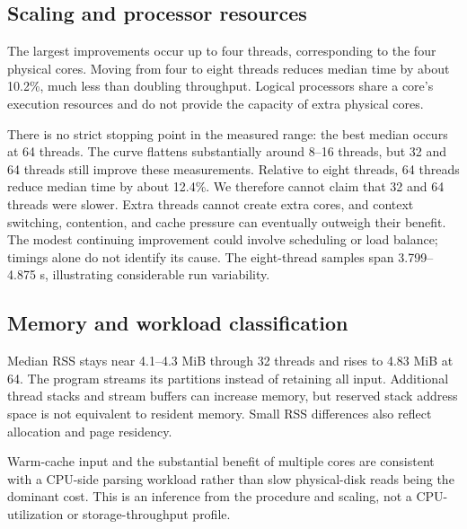 \documentclass{../latex/utmreport}
\begin{document}
\subsection{Scaling and processor resources}
The largest improvements occur up to four threads, corresponding to the four
physical cores. Moving from four to eight threads reduces median time by about
10.2\%, much less than doubling throughput. Logical processors share a core's
execution resources and do not provide the capacity of extra physical cores.

There is no strict stopping point in the measured range: the best median occurs
at 64 threads. The curve flattens substantially around 8--16 threads, but
32 and 64 threads still improve these measurements. Relative to eight threads,
64 threads reduce median time by about 12.4\%. We therefore cannot claim that
32 and 64 threads were slower. Extra threads cannot create extra cores, and
context switching, contention, and cache pressure can eventually outweigh their
benefit. The modest continuing improvement could involve scheduling or load
balance; timings alone do not identify its cause. The eight-thread samples
span 3.799--4.875 s, illustrating considerable run variability.

\subsection{Memory and workload classification}
Median RSS stays near 4.1--4.3 MiB through 32 threads and rises to 4.83 MiB at
64. The program streams its partitions instead of retaining all input.
Additional thread stacks and stream buffers can increase memory, but reserved
stack address space is not equivalent to resident memory. Small RSS differences
also reflect allocation and page residency.

Warm-cache input and the substantial benefit of multiple cores are consistent
with a CPU-side parsing workload rather than slow physical-disk reads being
the dominant cost. This is an inference from the procedure and scaling, not a
CPU-utilization or storage-throughput profile.
\end{document}
